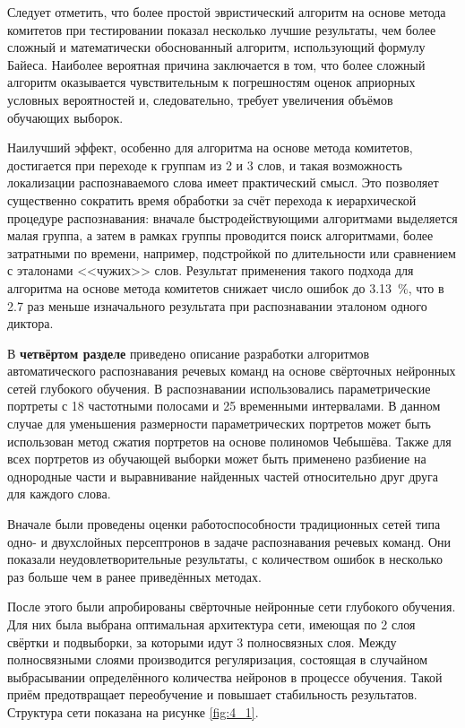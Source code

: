 Следует отметить, что более простой эвристический алгоритм на основе метода комитетов при тестировании показал несколько лучшие результаты, чем более сложный и математически обоснованный алгоритм, использующий формулу Байеса.
Наиболее вероятная причина заключается в том, что более сложный алгоритм оказывается чувствительным к погрешностям оценок априорных условных вероятностей и, следовательно, требует увеличения объёмов обучающих выборок.

Наилучший эффект, особенно для алгоритма на основе метода комитетов, достигается при переходе к группам из 2 и 3 слов, и такая возможность локализации распознаваемого слова имеет практический смысл.
Это позволяет существенно сократить время обработки за счёт перехода к иерархической процедуре распознавания: вначале быстродействующими алгоритмами выделяется малая группа, а затем в рамках группы проводится поиск алгоритмами, более затратными по времени, например, подстройкой по длительности или сравнением с эталонами <<чужих>> слов.
Результат применения такого подхода для алгоритма на основе метода комитетов снижает число ошибок до 3.13~\%, что в 2.7 раз меньше изначального результата при распознавании эталоном одного диктора.


В \textbf{четвёртом разделе} приведено описание разработки алгоритмов автоматического распознавания речевых команд на основе свёрточных нейронных сетей глубокого обучения.
В распознавании использовались параметрические портреты с 18 частотными полосами и 25 временными интервалами.
В данном случае для уменьшения размерности параметрических портретов может быть использован метод сжатия портретов на основе полиномов Чебышёва.
Также для всех портретов из обучающей выборки может быть применено разбиение на однородные части и выравнивание найденных частей относительно друг друга для каждого слова.

Вначале были проведены оценки работоспособности традиционных сетей типа одно- и двухслойных персептронов в задаче распознавания речевых команд.
Они показали неудовлетворительные результаты, с количеством ошибок в несколько раз больше чем в ранее приведённых методах.

После этого были апробированы свёрточные нейронные сети глубокого обучения.
Для них была выбрана оптимальная архитектура сети, имеющая по 2 слоя свёртки и подвыборки, за которыми идут 3 полносвязных слоя.
Между полносвязными слоями производится регуляризация, состоящая в случайном выбрасывании определённого количества нейронов в процессе обучения.
Такой приём предотвращает переобучение и повышает стабильность результатов.
Структура сети показана на рисунке \ref{fig:4_1}.

